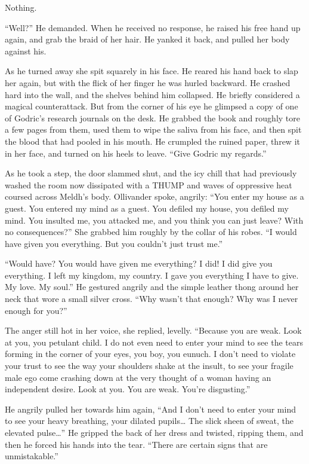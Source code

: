 Nothing.

“Well?” He demanded. When he received no response, he raised his free hand up again, and grab the braid of her hair. He yanked it back, and pulled her body against his.

As he turned away she spit squarely in his face. He reared his hand back to slap her again, but with the flick of her finger he was hurled backward. He crashed hard into the wall, and the shelves behind him collapsed. He briefly considered a magical counterattack. But from the corner of his eye he glimpsed a copy of one of Godric’s research journals on the desk. He grabbed the book and roughly tore a few pages from them, used them to wipe the saliva from his face, and then spit the blood that had pooled in his mouth. He crumpled the ruined paper, threw it in her face, and turned on his heels to leave. “Give Godric my regards.”

As he took a step, the door slammed shut, and the icy chill that had previously washed the room now dissipated with a THUMP and waves of oppressive heat coursed across Meldh’s body. Ollivander spoke, angrily: “You enter my house as a guest. You entered my mind as a guest. You defiled my house, you defiled my mind. You insulted me, you attacked me, and you think you can just leave? With no consequences?” She grabbed him roughly by the collar of his robes. “I would have given you everything. But you couldn’t just trust me.”

“Would have? You would have given me everything? I did! I did give you everything. I left my kingdom, my country. I gave you everything I have to give. My love. My soul.” He gestured angrily and the simple leather thong around her neck that wore a small silver cross. “Why wasn’t that enough? Why was I never enough for you?”

The anger still hot in her voice, she replied, levelly. “Because you are weak. Look at you, you petulant child. I do not even need to enter your mind to see the tears forming in the corner of your eyes, you boy, you eunuch. I don’t need to violate your trust to see the way your shoulders shake at the insult, to see your fragile male ego come crashing down at the very thought of a woman having an independent desire. Look at you. You are weak. You’re disgusting.”

He angrily pulled her towards him again, “And I don’t need to enter your mind to see your heavy breathing, your dilated pupils… The slick sheen of sweat, the elevated pulse…” He gripped the back of her dress and twisted, ripping them, and then he forced his hands into the tear. “There are certain signs that are unmistakable.”

